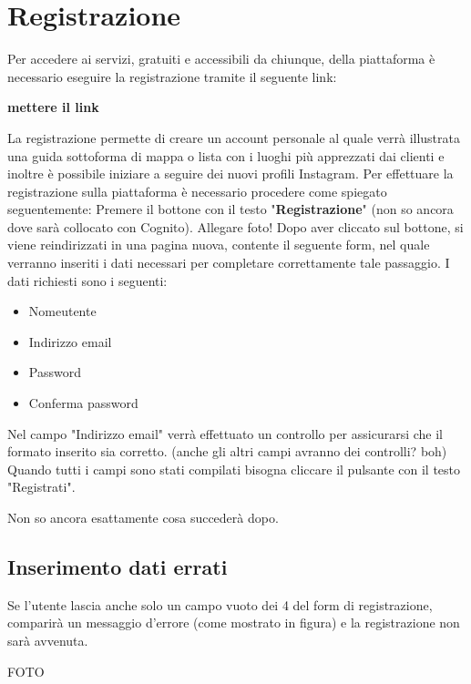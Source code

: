 \section{Registrazione} {

Per accedere ai servizi, gratuiti e accessibili da chiunque, della piattaforma \platform  è necessario eseguire la registrazione tramite il seguente link:
\begin{center}
    \textbf{mettere il link} 
\end{center} 
La registrazione permette di creare un account personale al quale verrà illustrata una guida sottoforma di mappa o lista con i luoghi più apprezzati dai clienti e 
inoltre è possibile iniziare a seguire dei nuovi profili Instagram. \aCapo
Per effettuare la registrazione sulla piattaforma \platform è necessario procedere come spiegato seguentemente: \aCapo 
Premere il bottone con il testo "\textbf{Registrazione}" (non so ancora dove sarà collocato con Cognito).
Allegare foto! \aCapo
Dopo aver cliccato sul bottone, si viene reindirizzati in una pagina nuova, contente il seguente form, nel quale verranno inseriti i dati necessari per completare 
correttamente tale passaggio. \aCapo
I dati richiesti sono i seguenti:
\begin{itemize}
    \item Nomeutente 
    \item Indirizzo email
    \item Password
    \item Conferma password
\end{itemize}
Nel campo "Indirizzo email" verrà effettuato un controllo per assicurarsi che il formato inserito sia corretto. (anche gli altri campi avranno dei controlli? boh) \aCapo
Quando tutti i campi sono stati compilati bisogna cliccare il pulsante con il testo "Registrati". \aCapo

Non so ancora esattamente cosa succederà dopo. 

\subsection{Inserimento dati errati} {
Se l'utente lascia anche solo un campo vuoto dei 4 del form di registrazione, comparirà un messaggio d'errore (come mostrato in figura) e 
la registrazione non sarà avvenuta. 

FOTO 


}

}
